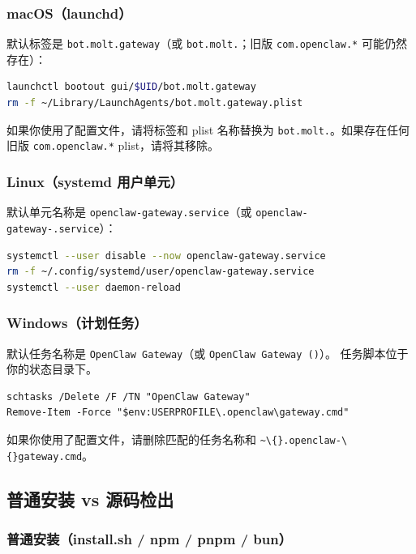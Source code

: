 \subsubsection{macOS（launchd）}


默认标签是 \texttt{bot.molt.gateway}（或 \texttt{bot.molt.}；旧版 \texttt{com.openclaw.*} 可能仍然存在）：

\begin{lstlisting}[language=bash]
launchctl bootout gui/$UID/bot.molt.gateway
rm -f ~/Library/LaunchAgents/bot.molt.gateway.plist
\end{lstlisting}


如果你使用了配置文件，请将标签和 plist 名称替换为 \texttt{bot.molt.}。如果存在任何旧版 \texttt{com.openclaw.*} plist，请将其移除。

\subsubsection{Linux（systemd 用户单元）}


默认单元名称是 \texttt{openclaw-gateway.service}（或 \texttt{openclaw-gateway-.service}）：

\begin{lstlisting}[language=bash]
systemctl --user disable --now openclaw-gateway.service
rm -f ~/.config/systemd/user/openclaw-gateway.service
systemctl --user daemon-reload
\end{lstlisting}


\subsubsection{Windows（计划任务）}


默认任务名称是 \texttt{OpenClaw Gateway}（或 \texttt{OpenClaw Gateway ()}）。
任务脚本位于你的状态目录下。

\begin{lstlisting}
schtasks /Delete /F /TN "OpenClaw Gateway"
Remove-Item -Force "$env:USERPROFILE\.openclaw\gateway.cmd"
\end{lstlisting}


如果你使用了配置文件，请删除匹配的任务名称和 \texttt{\textasciitilde{}\textbackslash\{\}.openclaw-\textbackslash\{\}gateway.cmd}。

\subsection{普通安装 vs 源码检出}


\subsubsection{普通安装（install.sh / npm / pnpm / bun）}


